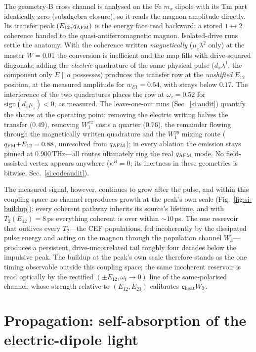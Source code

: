 \documentclass[11pt]{article}
\newcommand{\qafm}{q_{\rm AFM}}
\newcommand{\qfm}{q_{\rm FM}}
\begin{document}
The geometry-B cross channel is analysed on the Fe $m_x$ dipole with
its Tm part identically zero (subalgebra closure), so it reads the
magnon amplitude directly.  Its transfer peak $(E_{12},\qafm)$ is the
energy face read backward: a stored $1\!\leftrightarrow\!2$ coherence
handed to the quasi-antiferromagnetic magnon.  Isolated-drive runs
settle the anatomy.  With the coherence written \emph{magnetically}
($\mu_z\lambda^2$ only) at the master $W=0.01$ the conversion is
inefficient and the map fills with drive-squared diagonals; adding the
\emph{electric} quadrature of the same physical pulse
($d_x\lambda^1$, the component only $E\!\parallel\!a$ possesses)
produces the transfer row at the \emph{unshifted} $E_{12}$ position,
at the measured amplitude for $w_{E1}=0.54$, with strays below
$0.17$.  The interference of the two quadratures places the row at
$\omega_\tau=0.52$ for $\mathrm{sign}(d_x\mu_z)<0$, as measured.  The
leave-one-out runs (Sec.~\ref{si:audit}) quantify the shares at the
operating point: removing the electric writing halves the transfer
($0.49$), removing $W^{xz}_1$ costs a quarter ($0.76$), the remainder
flowing through the magnetically written quadrature and the
$W^{yy}_1$ mixing route ($\qfm{+}E_{12}=0.88$, unresolved from
$\qafm$); in every ablation the emission stays pinned at
$0.900$\,THz---all routes ultimately ring the real $\qafm$ mode.  No
field-assisted vertex appears anywhere ($\kappa^B=0$; its inertness in
these geometries is bitwise, Sec.~\ref{si:codeaudit}).

The measured signal, however, continues to grow after the pulse, and
within this coupling space no channel reproduces growth at the peak's
own scale (Fig.~\ref{fig:si-buildup}): every coherent pathway inherits
its source's lifetime, and with $T_2(E_{12})=8$\,ps everything
coherent is over within $\sim10$\,ps.  The one reservoir that outlives
every $T_2$---the CEF populations, fed incoherently by the dissipated
pulse energy and acting on the magnon through the population channel
$W_3$---produces a persistent, drive-uncorrelated tail roughly four
decades below the impulsive peak.  The buildup at the peak's own scale
therefore stands as the one timing observable outside this coupling
space; the same incoherent reservoir is read optically by the
rectified $(\pm E_{12},\omega_t\!\to\!0)$ line of the same-polarised
channel, whose strength relative to $(E_{12},E_{23})$ calibrates
$c_{\rm heat}W_3$.

\section{Propagation: self-absorption of the electric-dipole light}
\label{si:propagation}
\end{document}
